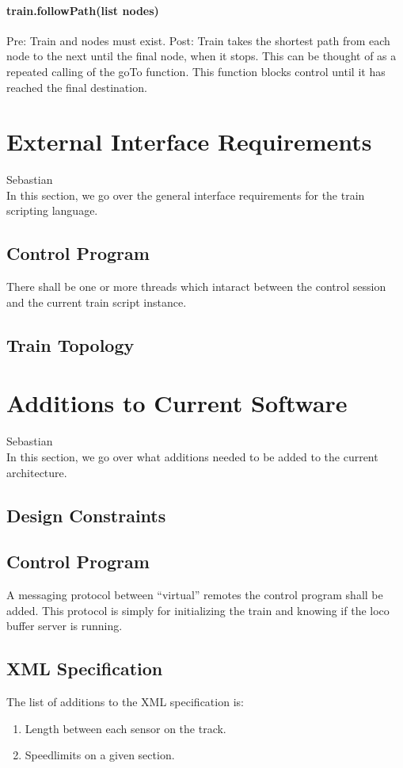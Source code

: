 \documentclass[a4paper,11pt,notitlepage]{article}
\begin{document}
\paragraph{train.followPath(list nodes)} Pre: Train and nodes must exist. Post: Train takes the shortest path from each node to the next until the final node, when it stops. This can be thought of as a repeated calling of the goTo function. This function blocks control until it has reached the final destination.

\newpage
\section{External Interface Requirements}
Sebastian\\
    In this section, we go over the general interface requirements for the train scripting language.
\subsection{Control Program}
    There shall be one or more threads which intaract between the control session and the current train script instance.
\subsection{Train Topology}

\newpage
\section{Additions to Current Software}
Sebastian \\
    In this section, we go over what additions needed to be added to the
    current architecture.
\subsection{Design Constraints}
\subsection{Control Program}
    A messaging protocol between ``virtual'' remotes the control program shall be added.  This protocol is simply for initializing the train and knowing if the loco buffer server is running.
\subsection{XML Specification}
    The list of additions to the XML specification is:
\begin{enumerate}
    \item Length between each sensor on the track.
    \item Speedlimits on a given section.
\end{enumerate}
\end{document}
